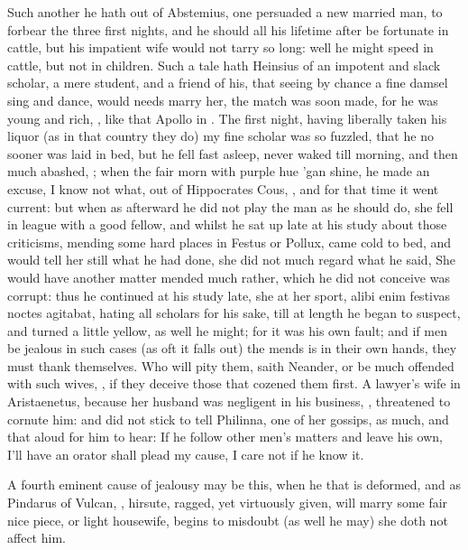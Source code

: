 Such another he hath out of Abstemius, one persuaded a new married man,
to forbear the three first nights, and he should all his lifetime
after be fortunate in cattle, but his impatient wife would not tarry so
long: well he might speed in cattle, but not in children. Such a tale
hath Heinsius of an impotent and slack scholar, a mere student, and a
friend of his, that seeing by chance a fine damsel sing and dance,
would needs marry her, the match was soon made, for he was young and
rich, , like that Apollo in \Apuleius{}. The first night, having
liberally taken his liquor (as in that country they do) my fine scholar
was so fuzzled, that he no sooner was laid in bed, but he fell fast
asleep, never waked till morning, and then much abashed, ; when the fair morn with purple hue
'gan shine, he made an excuse, I know not what, out of Hippocrates
Cous, \etc{}, and for that time it went current: but when as afterward he
did not play the man as he should do, she fell in league with a good
fellow, and whilst he sat up late at his study about those criticisms,
mending some hard places in Festus or Pollux, came cold to bed, and
would tell her still what he had done, she did not much regard what he
said, \etc{} She would have another matter mended much rather, which
he did not conceive was corrupt: thus he continued at his study late,
she at her sport, alibi enim festivas noctes agitabat, hating all
scholars for his sake, till at length he began to suspect, and turned a
little yellow, as well he might; for it was his own fault; and if men
be jealous in such cases (as oft it falls out) the mends is in
their own hands, they must thank themselves. Who will pity them, saith
Neander, or be much offended with such wives, , if they deceive those that cozened them
first. A lawyer's wife in Aristaenetus, because her husband was
negligent in his business, , threatened to
cornute him: and did not stick to tell Philinna, one of her gossips, as
much, and that aloud for him to hear: If he follow other men's matters
and leave his own, I'll have an orator shall plead my cause, I care not
if he know it.

A fourth eminent cause of jealousy may be this, when he that is
deformed, and as Pindarus of Vulcan, , hirsute,
ragged, yet virtuously given, will marry some fair nice piece, or light
housewife, begins to misdoubt (as well he may) she doth not affect him.

